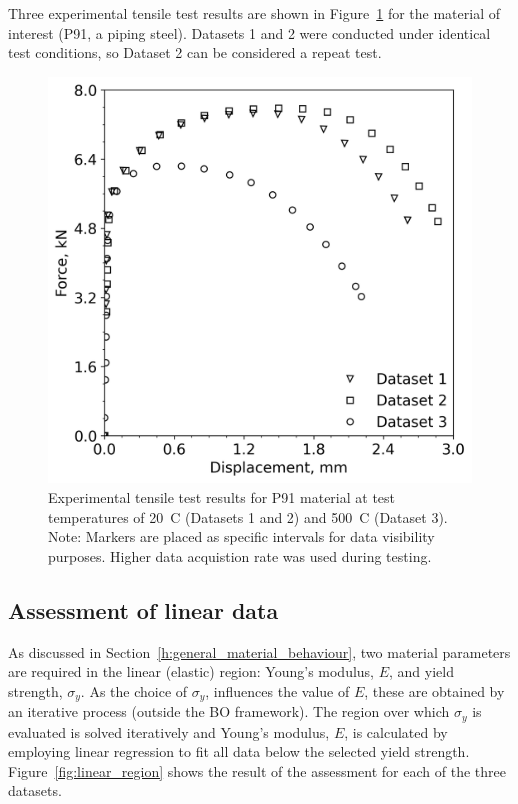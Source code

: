 \documentclass[preprint, review, 12pt]{elsarticle}
\begin{document}
	Three experimental tensile test results are shown in Figure~\ref{fig:exp_test_results} for the material of interest (P91, a piping steel).
	Datasets 1 and 2 were conducted under identical test conditions, so Dataset 2 can be considered a repeat test.

	\begin{figure}[!htbp]
		\centering
		\includegraphics[width=\linewidth, height=0.4\textheight, keepaspectratio]{EXPERIMENTAL_RESULTS}
		\caption{Experimental tensile test results for P91 material at test temperatures of 20~\degree C (Datasets 1 and 2) and 500~\degree C (Dataset 3). Note: Markers are placed as specific intervals for data visibility purposes. Higher data acquistion rate was used during testing.}
		\label{fig:exp_test_results}
	\end{figure}

	\subsection{Assessment of linear data}
	\label{h:linear_region}
	 As discussed in Section~\ref{h:general_material_behaviour}, two material parameters are required in the linear (elastic) region: Young's modulus, $E$, and yield strength, $\sigma_y$.
	As the choice of $\sigma_y$, influences the value of $E$, these are obtained by an iterative process (outside the BO framework).
	The region over which $\sigma_y$ is evaluated is solved iteratively and Young's modulus, $E$, is calculated by employing linear regression to fit all data below the selected yield strength.	Figure~\ref{fig:linear_region} shows the result of the assessment for each of the three datasets.
\end{document}

